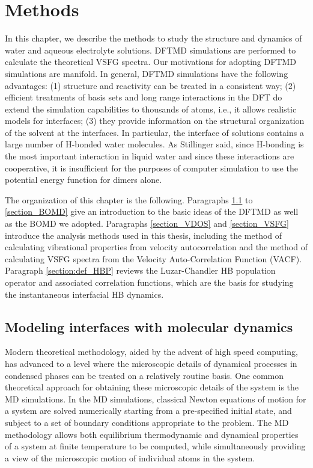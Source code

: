 \raggedbottom
\chapter{Methods}\label{CHAPTER_Methods}
In this chapter, we describe the methods to study the structure and dynamics of water and aqueous electrolyte solutions.
DFTMD simulations are performed to calculate the theoretical VSFG spectra. 
Our motivations for adopting DFTMD simulations are manifold.
In general, DFTMD simulations have the following advantages: 
(1) structure and reactivity can be treated in a consistent way;
(2) efficient treatments of basis sets and long range interactions in the DFT do extend the simulation capabilities to 
thousands of atoms, i.e., it allows realistic models for interfaces;
(3) they provide information on the structural organization of the solvent at the interfaces. 
In particular, the interface of solutions contains a large number of H-bonded water molecules.
As Stillinger said, since H-bonding is the most important interaction in liquid water and since these interactions 
are cooperative, it is insufficient for the purposes of computer simulation to use the potential energy function for dimers alone\cite{Stillinger1980}.

The organization of this chapter is the following.
Paragraphs \ref{section_AIMD} to \ref{section_BOMD} give an introduction to the basic ideas of the DFTMD as well as the BOMD we adopted.
Paragraphs \ref{section_VDOS} and \ref{section_VSFG} introduce the analysis methods used in this thesis, including the method of calculating 
vibrational properties from velocity autocorrelation and the method of calculating VSFG spectra from the Velocity Auto-Correlation Function (VACF).
Paragraph \ref{section:def_HBP} reviews the Luzar-Chandler HB population operator and associated correlation functions, which are the basis for studying the 
instantaneous interfacial HB dynamics. 

\section{Modeling interfaces with \abinitio molecular dynamics}\label{section_AIMD}
Modern theoretical methodology, aided by the advent of high speed computing, has advanced
to a level where the microscopic details of dynamical processes in condensed phases can be
treated on a relatively routine basis. One common theoretical approach
for obtaining these microscopic details of the system is the MD simulations.
In the MD simulations, classical Newton equations of motion for
a system are solved numerically starting from a pre-specified initial state, and subject to a set of
boundary conditions appropriate to the problem. The MD methodology allows both equilibrium
thermodynamic and dynamical properties of a system at finite temperature to be computed,
while simultaneously providing a view of the microscopic motion of individual atoms
in the system\cite{Tuckerman2010}.

